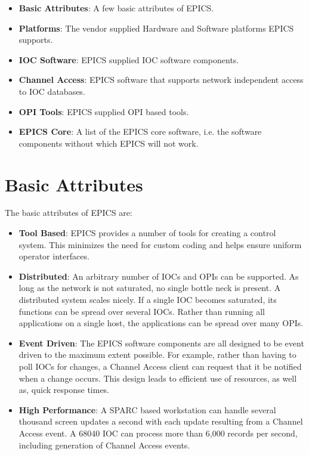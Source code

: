 \begin{itemize}

\item \textbf{\textbf{Basic Attributes}}: A few basic attributes of EPICS.
\item \textbf{\textbf{Platforms}}: The vendor supplied Hardware and Software platforms EPICS supports.
\item \textbf{\textbf{IOC Software}}: EPICS supplied IOC software components.
\item \textbf{\textbf{Channel Access}}:  EPICS software that supports network independent access to IOC databases.
\item \textbf{\textbf{OPI Tools}}: EPICS supplied OPI based tools.
\item \textbf{\textbf{EPICS Core}}: A list of the EPICS core software, i.e. the software components without which EPICS will not work.

\end{itemize}\section{Basic Attributes}

The basic attributes of EPICS are:

\begin{itemize}

\item \textbf{\textbf{Tool Based}}: EPICS provides a number of tools for creating a control system. This minimizes the need for custom 
coding and helps ensure uniform operator interfaces.

\item \textbf{\textbf{Distributed}}: An arbitrary number of IOCs and OPIs can be supported. As long as the network is not saturated, no 
single bottle neck is present. A distributed system scales nicely. If a single IOC becomes saturated, its functions can 
be spread over several IOCs. Rather than running all applications on a single host, the applications can be spread 
over many OPIs.

\item \textbf{\textbf{Event Driven}}: The EPICS software components are all designed to be event driven to the maximum extent 
possible. For example, rather than having to poll IOCs for changes, a Channel Access client can request that it be 
notified when a change occurs. This design leads to efficient use of resources, as well as, quick response times.

\item \textbf{\textbf{High Performance}}: A SPARC based workstation can handle several thousand screen updates a second with each 
update resulting from a Channel Access event. A 68040 IOC can process more than 6,000 records per second, 
including generation of Channel Access events. 

\end{itemize}

